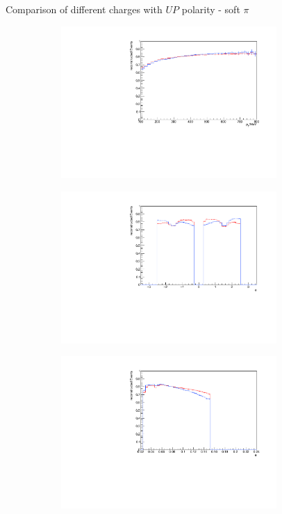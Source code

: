 \documentclass[11pt]{beamer}
\begin{document}
\begin{frame}{Comparison of different charges with $UP$ polarity - soft $\pi$}
\begin{figure}
\begin{subfigure}{0.45\textwidth}
\includegraphics[width=0.9\textwidth]{third/up_pdf/combined/h_pt_reco_SPi.pdf}
\end{subfigure}
\begin{subfigure}{0.45\textwidth}
\includegraphics[width=0.9\textwidth]{third/up_pdf/combined/h_phi_reco_SPi.pdf}
\end{subfigure}
\begin{subfigure}{0.45\textwidth}
\includegraphics[width=0.9\textwidth]{third/up_pdf/combined/h_theta_reco_SPi.pdf}

\end{subfigure}
\end{figure}
\end{frame}
\end{document}

